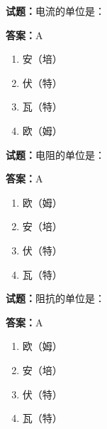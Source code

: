 \documentclass{ctexbook}
\begin{document}




\vspace{1em}

\textbf{试题：}电流的单位是： 

\textbf{答案：}A 

\begin{enumerate}[leftmargin=3em]
  \item 安（培） 

  \item 伏（特） 

  \item 瓦（特） 

  \item 欧（姆） 

\end{enumerate}





\vspace{1em}

\textbf{试题：}电阻的单位是： 

\textbf{答案：}A 

\begin{enumerate}[leftmargin=3em]
  \item 欧（姆） 

  \item 安（培） 

  \item 伏（特） 

  \item 瓦（特） 

\end{enumerate}





\vspace{1em}

\textbf{试题：}阻抗的单位是： 

\textbf{答案：}A 


\begin{enumerate}[leftmargin=3em]
  \item 欧（姆） 

  \item 安（培） 

  \item 伏（特） 

  \item 瓦（特） 

\end{enumerate}
\end{document}

